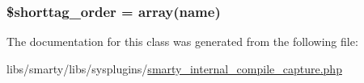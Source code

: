 \subsubsection[{\$shorttag\+\_\+order}]{\setlength{\rightskip}{0pt plus 5cm}\$shorttag\+\_\+order = array(\textquotesingle{}name\textquotesingle{})}\label{class_smarty___internal___compile___capture_a2ccb25269c3a92e8c4796c7ef23725e6}


The documentation for this class was generated from the following file\+:\begin{DoxyCompactItemize}
\item 
libs/smarty/libs/sysplugins/\hyperlink{smarty__internal__compile__capture_8php}{smarty\+\_\+internal\+\_\+compile\+\_\+capture.\+php}\end{DoxyCompactItemize}
